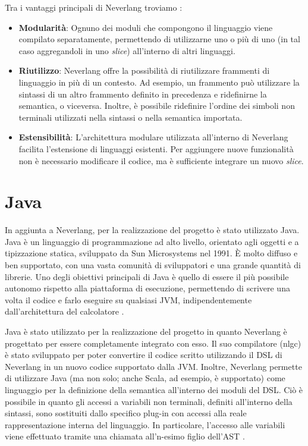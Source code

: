 \documentclass[12pt,a4paper,openright,twoside]{book}
\begin{document}
Tra i vantaggi principali di Neverlang troviamo \cite{Cazzola2012}:
\begin{itemize}
    \item \textbf{Modularità}: Ognuno dei moduli che compongono il linguaggio viene compilato separatamente, permettendo di utilizzarne uno o 
    più di uno (in tal caso aggregandoli in uno \textit{slice}) all’interno di altri linguaggi.
    \item \textbf{Riutilizzo}: Neverlang offre la possibilità di riutilizzare frammenti di linguaggio in più di un contesto. Ad esempio, un 
    frammento può utilizzare la sintassi di un altro frammento definito in precedenza e ridefinirne la semantica, o viceversa. Inoltre, è 
    possibile ridefinire l’ordine dei simboli non terminali utilizzati nella sintassi o nella semantica importata.
    \item \textbf{Estensibilità}: L’architettura modulare utilizzata all’interno di Neverlang facilita l’estensione di linguaggi esistenti. 
    Per aggiungere nuove funzionalità non è necessario modificare il codice, ma è sufficiente integrare un nuovo \textit{slice}.
\end{itemize}


\section{Java}
In aggiunta a Neverlang, per la realizzazione del progetto è stato utilizzato Java. Java è un linguaggio di programmazione ad alto livello, 
orientato agli oggetti e a tipizzazione statica, sviluppato da Sun Microsystems nel 1991. È molto diffuso e ben supportato, con una vasta 
comunità di sviluppatori e una grande quantità di librerie. Uno degli obiettivi principali di Java è quello di essere il più possibile 
autonomo rispetto alla piattaforma di esecuzione, permettendo di scrivere una volta il codice e farlo eseguire su qualsiasi \ac{JVM}, 
indipendentemente dall'architettura del calcolatore \cite{IBMWebsite}.

Java è stato utilizzato per la realizzazione del progetto in quanto Neverlang è progettato per essere completamente integrato con esso. Il suo 
compilatore (nlgc) è stato sviluppato per poter convertire il codice scritto utilizzando il DSL di Neverlang in un nuovo codice supportato 
dalla \ac{JVM}. Inoltre, Neverlang permette di utilizzare Java (ma non solo; anche Scala, ad esempio, è supportato) come linguaggio per la 
definizione della semantica all'interno dei moduli del \ac{DSL}. Ciò è possibile in quanto gli accessi a variabili non terminali, definiti 
all'interno della sintassi, sono sostituiti dallo specifico plug-in con accessi alla reale rappresentazione interna del linguaggio. In 
particolare, l'accesso alle variabili viene effettuato tramite una chiamata all'n-esimo figlio dell'\ac{AST} \cite{Cazzola2013}.
\end{document}
